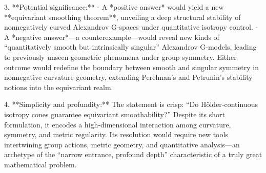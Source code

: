 3. **Potential significance:**  
   - A *positive answer* would yield a new **equivariant smoothing theorem**, unveiling a deep structural stability of nonnegatively curved Alexandrov G-spaces under quantitative isotropy control.  
   - A *negative answer*—a counterexample—would reveal new kinds of “quantitatively smooth but intrinsically singular” Alexandrov G-models, leading to previously unseen geometric phenomena under group symmetry.  
   Either outcome would redefine the boundary between smooth and singular symmetry in nonnegative curvature geometry, extending Perelman’s and Petrunin’s stability notions into the equivariant realm.

4. **Simplicity and profundity:**  
   The statement is crisp: “Do Hölder‑continuous isotropy cones guarantee equivariant smoothability?” Despite its short formulation, it encodes a high‑dimensional interaction among curvature, symmetry, and metric regularity. Its resolution would require new tools intertwining group actions, metric geometry, and quantitative analysis—an archetype of the “narrow entrance, profound depth” characteristic of a truly great mathematical problem.